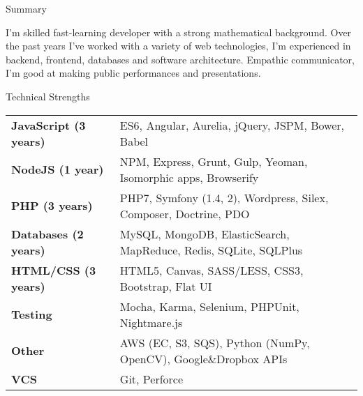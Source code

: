\documentclass{resume} %
\begin{document}

\begin{rSection}{Summary}

I'm skilled fast-learning developer with a strong mathematical background.
Over the past years I've worked with a variety of web technologies, I'm experienced in backend, frontend, databases and software architecture.
Empathic communicator, I'm good at making public performances and presentations.

\end{rSection}



\begin{rSection}{Technical Strengths}

\begin{tabular}{ @{} >{\bfseries}l @{\hspace{4ex}} l }
JavaScript (3 years) & ES6, Angular, Aurelia, jQuery, JSPM, Bower, Babel \\
NodeJS (1 year) & NPM, Express, Grunt, Gulp, Yeoman, Isomorphic apps, Browserify \\
PHP (3 years) & PHP7, Symfony (1.4, 2), Wordpress, Silex, Composer, Doctrine, PDO \\
Databases (2 years) & MySQL, MongoDB, ElasticSearch, MapReduce, Redis, SQLite, SQLPlus \\
HTML/CSS (3 years) & HTML5, Canvas, SASS/LESS, CSS3, Bootstrap, Flat UI \\
Testing & Mocha, Karma, Selenium, PHPUnit, Nightmare.js \\
Other & AWS (EC, S3, SQS), Python (NumPy, OpenCV), Google\&Dropbox APIs \\
VCS & Git, Perforce \\
\end{tabular}

\end{rSection}

\end{document}
